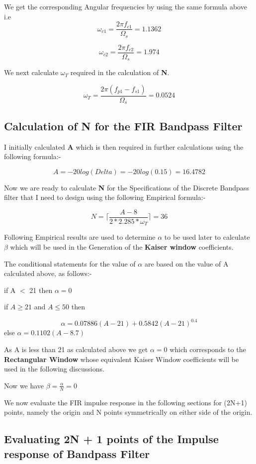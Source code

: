 \documentclass[12pt]{article}
\begin{document}
We get the corresponding Angular frequencies by using the same formula above i.e
\[\omega_{c1} = \frac{2\pi f_{c1}}{\Omega_{s}} = 1.1362\]

\[\omega_{c2} = \frac{2\pi f_{c2}}{\Omega_{s}} = 1.974\]

We next calculate $\omega_{T}$ required in the calculation of \textbf{N}.

\[\omega_{T} = \frac{2\pi(f_{p1} - f_{s1})}{\Omega_{s}} = 0.0524\]

\subsection{Calculation of N for the FIR Bandpass Filter}

I initially calculated \textbf{A} which is then required in further calculations using the following formula:- 

\[A = -20log(Delta) = -20log(0.15) = 16.4782\]

Now we are ready to calculate \textbf{N} for the Specifications of the Discrete Bandpass filter that I need to design using the following Empirical formula:- 

\[N = \lceil \frac{A - 8}{2*2.285*\omega_{T}} \rceil = 36\]

Following Empirical results are used to determine $\alpha$ to be used later to calculate $\beta$ which will be used in the Generation of the \textbf{Kaiser window} coefficients.

\newpage

The conditional statements for the value of $\alpha$ are based on the value of A calculated above, as follows:- \par

if A $<$ 21 then $\alpha = 0$ \par
if $A \geq 21$ and $A \leq 50$ then \par
\[\alpha = 0.07886(A - 21) + 0.5842(A - 21)^{0.4}\]
else $\alpha = 0.1102(A - 8.7)$ \par
As A is less than 21 as calculated above we get $\alpha = 0$ which corresponds to the \textbf{Rectangular Window} whose equivalent Kaiser Window coefficients will be used in the following discussions.


Now we have $\beta = \frac{\alpha}{N} = 0$

We now evaluate the FIR impulse response in the following sections for (2N+1) points, namely the origin and N points symmetrically on either side of the origin.

\subsection{Evaluating 2N + 1 points of the Impulse response of  Bandpass Filter}
\end{document}
